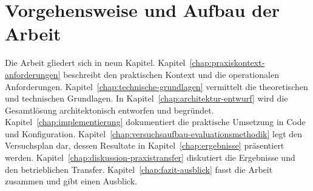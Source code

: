\section{Vorgehensweise und Aufbau der Arbeit}
\label{sec:vorgehensweise-aufbau}
Die Arbeit gliedert sich in neun Kapitel. Kapitel~\ref{chap:praxiskontext-anforderungen} beschreibt den praktischen Kontext und die operationalen Anforderungen. Kapitel~\ref{chap:technische-grundlagen} vermittelt die theoretischen und technischen Grundlagen. In Kapitel~\ref{chap:architektur-entwurf} wird die Gesamtlösung architektonisch entworfen und begründet. Kapitel~\ref{chap:implementierung} dokumentiert die praktische Umsetzung in Code und Konfiguration. Kapitel~\ref{chap:versuchsaufbau-evaluationsmethodik} legt den Versuchsplan dar, dessen Resultate in Kapitel~\ref{chap:ergebnisse} präsentiert werden. Kapitel~\ref{chap:diskussion-praxistransfer} diskutiert die Ergebnisse und den betrieblichen Transfer. Kapitel~\ref{chap:fazit-ausblick} fasst die Arbeit zusammen und gibt einen Ausblick.
